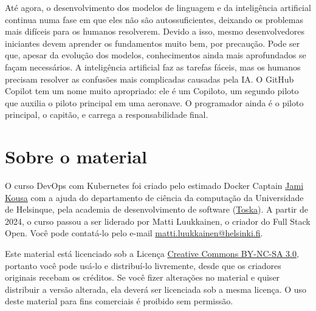 \documentclass[11pt,a4paper]{article}
\begin{document}
Até agora, o desenvolvimento dos modelos de linguagem e da inteligência artificial continua numa fase em que eles não são autossuficientes, deixando os problemas mais difíceis para os humanos resolverem. Devido a isso, mesmo desenvolvedores iniciantes devem aprender os fundamentos muito bem, por precaução. Pode ser que, apesar da evolução dos modelos, conhecimentos ainda mais aprofundados se façam necessários. A inteligência artificial faz as tarefas fáceis, mas os humanos precisam resolver as confusões mais complicadas causadas pela IA. O GitHub Copilot tem um nome muito apropriado: ele é um Copiloto, um segundo piloto que auxilia o piloto principal em uma aeronave. O programador ainda é o piloto principal, o capitão, e carrega a responsabilidade final.

\section{Sobre o material}
O curso DevOps com Kubernetes foi criado pelo estimado Docker Captain \href{https://www.docker.com/contributors/jami-kousa/}{Jami Kousa} com a ajuda do departamento de ciência da computação da Universidade de Helsinque, pela academia de desenvolvimento de software (\href{https://toska.dev/}{Toska}). A partir de 2024, o curso passou a ser liderado por Matti Luukkainen, o criador do Full Stack Open. Você pode contatá-lo pelo e-mail \href{mailto:matti.luukkainen@helsinki.fi}{matti.luukkainen@helsinki.fi}.

Este material está licenciado sob a Licença \href{https://creativecommons.org/licenses/by-nc-sa/3.0/}{Creative Commons BY-NC-SA 3.0}, portanto você pode usá-lo e distribuí-lo livremente, desde que os criadores originais recebam os créditos. Se você fizer alterações no material e quiser distribuir a versão alterada, ela deverá ser licenciada sob a mesma licença. O uso deste material para fins comerciais é proibido sem permissão.
\end{document}
